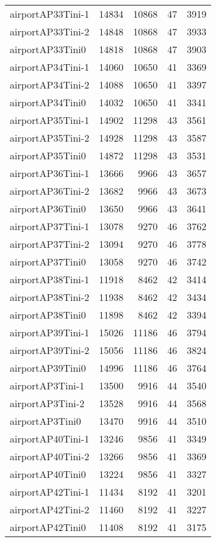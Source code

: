 \begin{tabular}{lrrrr}
airportAP33Tini-1 & 14834 & 10868 & 47 & 3919 \\
airportAP33Tini-2 & 14848 & 10868 & 47 & 3933 \\
airportAP33Tini0 & 14818 & 10868 & 47 & 3903 \\
airportAP34Tini-1 & 14060 & 10650 & 41 & 3369 \\
airportAP34Tini-2 & 14088 & 10650 & 41 & 3397 \\
airportAP34Tini0 & 14032 & 10650 & 41 & 3341 \\
airportAP35Tini-1 & 14902 & 11298 & 43 & 3561 \\
airportAP35Tini-2 & 14928 & 11298 & 43 & 3587 \\
airportAP35Tini0 & 14872 & 11298 & 43 & 3531 \\
airportAP36Tini-1 & 13666 & 9966 & 43 & 3657 \\
airportAP36Tini-2 & 13682 & 9966 & 43 & 3673 \\
airportAP36Tini0 & 13650 & 9966 & 43 & 3641 \\
airportAP37Tini-1 & 13078 & 9270 & 46 & 3762 \\
airportAP37Tini-2 & 13094 & 9270 & 46 & 3778 \\
airportAP37Tini0 & 13058 & 9270 & 46 & 3742 \\
airportAP38Tini-1 & 11918 & 8462 & 42 & 3414 \\
airportAP38Tini-2 & 11938 & 8462 & 42 & 3434 \\
airportAP38Tini0 & 11898 & 8462 & 42 & 3394 \\
airportAP39Tini-1 & 15026 & 11186 & 46 & 3794 \\
airportAP39Tini-2 & 15056 & 11186 & 46 & 3824 \\
airportAP39Tini0 & 14996 & 11186 & 46 & 3764 \\
airportAP3Tini-1 & 13500 & 9916 & 44 & 3540 \\
airportAP3Tini-2 & 13528 & 9916 & 44 & 3568 \\
airportAP3Tini0 & 13470 & 9916 & 44 & 3510 \\
airportAP40Tini-1 & 13246 & 9856 & 41 & 3349 \\
airportAP40Tini-2 & 13266 & 9856 & 41 & 3369 \\
airportAP40Tini0 & 13224 & 9856 & 41 & 3327 \\
airportAP42Tini-1 & 11434 & 8192 & 41 & 3201 \\
airportAP42Tini-2 & 11460 & 8192 & 41 & 3227 \\
airportAP42Tini0 & 11408 & 8192 & 41 & 3175 \\

\end{tabular}
